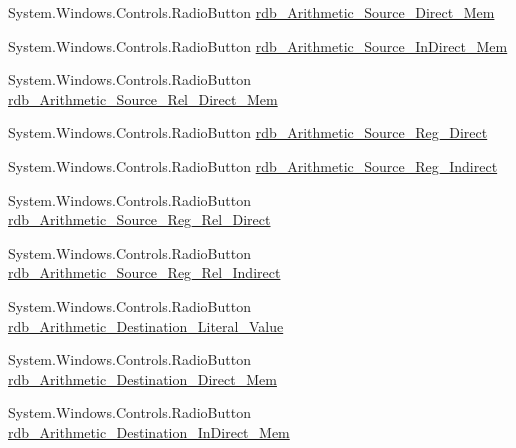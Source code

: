 \begin{DoxyCompactItemize}
\item 
System.\+Windows.\+Controls.\+Radio\+Button \hyperlink{class_c_p_u___o_s___simulator_1_1_instructions_window_a49a641bd5194ed2c7f369c47c44a7e38}{rdb\+\_\+\+Arithmetic\+\_\+\+Source\+\_\+\+Direct\+\_\+\+Mem}
\item 
System.\+Windows.\+Controls.\+Radio\+Button \hyperlink{class_c_p_u___o_s___simulator_1_1_instructions_window_a8dc1b6bd60593eae9e67b741ac8fc8b0}{rdb\+\_\+\+Arithmetic\+\_\+\+Source\+\_\+\+In\+Direct\+\_\+\+Mem}
\item 
System.\+Windows.\+Controls.\+Radio\+Button \hyperlink{class_c_p_u___o_s___simulator_1_1_instructions_window_a6d1f41b90c63906eb36076cf0626bc7d}{rdb\+\_\+\+Arithmetic\+\_\+\+Source\+\_\+\+Rel\+\_\+\+Direct\+\_\+\+Mem}
\item 
System.\+Windows.\+Controls.\+Radio\+Button \hyperlink{class_c_p_u___o_s___simulator_1_1_instructions_window_ae28e030e66d618041d7662253829ea3a}{rdb\+\_\+\+Arithmetic\+\_\+\+Source\+\_\+\+Reg\+\_\+\+Direct}
\item 
System.\+Windows.\+Controls.\+Radio\+Button \hyperlink{class_c_p_u___o_s___simulator_1_1_instructions_window_ad7f9237f20708f173ca9b33d85eeda9b}{rdb\+\_\+\+Arithmetic\+\_\+\+Source\+\_\+\+Reg\+\_\+\+Indirect}
\item 
System.\+Windows.\+Controls.\+Radio\+Button \hyperlink{class_c_p_u___o_s___simulator_1_1_instructions_window_a7277844212c1cee99533133b9c95f0c7}{rdb\+\_\+\+Arithmetic\+\_\+\+Source\+\_\+\+Reg\+\_\+\+Rel\+\_\+\+Direct}
\item 
System.\+Windows.\+Controls.\+Radio\+Button \hyperlink{class_c_p_u___o_s___simulator_1_1_instructions_window_a2024ddbf6f4c2f03239c91ddec502c19}{rdb\+\_\+\+Arithmetic\+\_\+\+Source\+\_\+\+Reg\+\_\+\+Rel\+\_\+\+Indirect}
\item 
System.\+Windows.\+Controls.\+Radio\+Button \hyperlink{class_c_p_u___o_s___simulator_1_1_instructions_window_ab767e189a1d4db64e4deedfcc39f31fb}{rdb\+\_\+\+Arithmetic\+\_\+\+Destination\+\_\+\+Literal\+\_\+\+Value}
\item 
System.\+Windows.\+Controls.\+Radio\+Button \hyperlink{class_c_p_u___o_s___simulator_1_1_instructions_window_ac7e55b15dbcf0e9c8db38901e10d8623}{rdb\+\_\+\+Arithmetic\+\_\+\+Destination\+\_\+\+Direct\+\_\+\+Mem}
\item 
System.\+Windows.\+Controls.\+Radio\+Button \hyperlink{class_c_p_u___o_s___simulator_1_1_instructions_window_a8cec1756cbe5076b483601dc06dc2c80}{rdb\+\_\+\+Arithmetic\+\_\+\+Destination\+\_\+\+In\+Direct\+\_\+\+Mem}
\item 

\end{DoxyCompactItemize}

